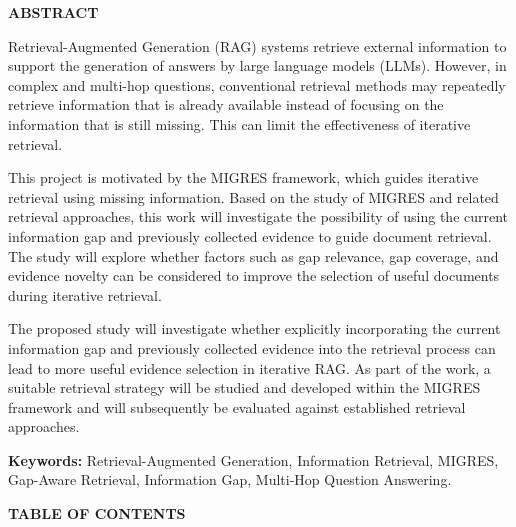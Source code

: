 \documentclass[12pt,a4paper]{report}
\newcommand{\fronttitle}[1]{
    \begin{center}
        {\fontsize{18}{21}\selectfont\bfseries #1\par}
    \end{center}
    \vspace{0.12in}
}
\begin{document}
\setcounter{page}{1}


\fronttitle{ABSTRACT}

\justifying

Retrieval-Augmented Generation (RAG) systems retrieve external information to support the generation of answers by large language models (LLMs). However, in complex and multi-hop questions, conventional retrieval methods may repeatedly retrieve information that is already available instead of focusing on the information that is still missing. This can limit the effectiveness of iterative retrieval.

This project is motivated by the MIGRES framework, which guides iterative retrieval using missing information. Based on the study of MIGRES and related retrieval approaches, this work will investigate the possibility of using the current information gap and previously collected evidence to guide document retrieval. The study will explore whether factors such as gap relevance, gap coverage, and evidence novelty can be considered to improve the selection of useful documents during iterative retrieval.

The proposed study will investigate whether explicitly incorporating the current information gap and previously collected evidence into the retrieval process can lead to more useful evidence selection in iterative RAG. As part of the work, a suitable retrieval strategy will be studied and developed within the MIGRES framework and will subsequently be evaluated against established retrieval approaches.

\vspace{0.10in}

\textbf{Keywords:}
Retrieval-Augmented Generation, Information Retrieval, MIGRES, Gap-Aware Retrieval, Information Gap, Multi-Hop Question Answering.
\clearpage



\fronttitle{TABLE OF CONTENTS}
\end{document}
